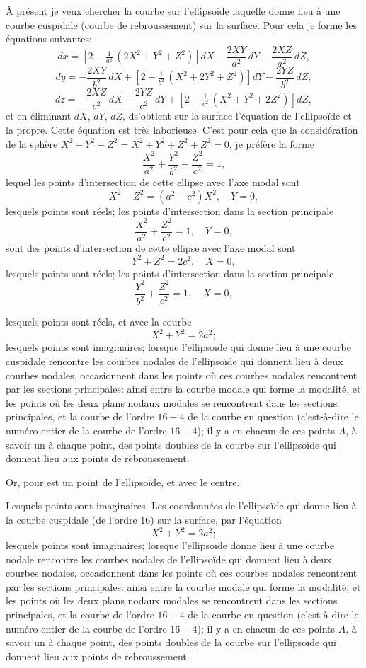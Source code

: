 \documentclass[11pt,a4paper]{article}
\begin{document}
\setcounter{page}{129}

À présent je veux chercher la courbe sur l'ellipsoïde laquelle donne lieu à une courbe cuspidale (courbe de rebroussement) sur la surface. Pour cela je forme les équations suivantes:
\[
dx = \left[2 - \tfrac{1}{a^2}\,(2X^2+Y^2+Z^2)\right]dX - \frac{2XY}{a^2}\,dY - \frac{2XZ}{a^2}\,dZ,
\]
\[
dy = -\frac{2XY}{b^2}\,dX + \left[2 - \tfrac{1}{b^2}\,(X^2+2Y^2+Z^2)\right]dY - \frac{2YZ}{b^2}\,dZ,
\]
\[
dz = -\frac{2XZ}{c^2}\,dX - \frac{2YZ}{c^2}\,dY + \left[2 - \tfrac{1}{c^2}\,(X^2+Y^2+2Z^2)\right]dZ,
\]
et en éliminant $dX$, $dY$, $dZ$, ds'obtient sur la surface l'équation de l'ellipsoïde et la propre. Cette équation est très laborieuse. C'est pour cela que la considération de la sphère $X^2 + Y^2 + Z^2 = X^2 + Y^2 + Z^2 + Z^2 = 0$, je préfère la forme
\[
\frac{X^2}{a^2} + \frac{Y^2}{b^2} + \frac{Z^2}{c^2} = 1,
\]
lequel les points d'intersection de cette ellipse avec l'axe modal sont
\[
X^2 - Z^2 = (a^2 - c^2)X^2,\quad Y = 0,
\]
lesquels points sont réels; les points d'intersection dans la section principale
\[
\frac{X^2}{a^2} + \frac{Z^2}{c^2} = 1,\quad Y = 0,
\]
sont des points d'intersection de cette ellipse avec l'axe modal sont
\[
Y^2 + Z^2 = 2c^2,\quad X = 0,
\]
lesquels points sont réels; les points d'intersection dans la section principale
\[
\frac{Y^2}{b^2} + \frac{Z^2}{c^2} = 1,\quad X = 0,
\]

\setcounter{page}{130}

lesquels points sont réels, et avec la courbe
\[
X^2 + Y^2 = 2a^2;
\]
lesquels points sont imaginaires; lorsque l'ellipsoïde qui donne lieu à une courbe cuspidale rencontre les courbes nodales de l'ellipsoïde qui donnent lieu à deux courbes nodales, occasionnent dans les points où ces courbes nodales rencontrent par les sections principales: ainsi entre la courbe modale qui forme la modalité, et les points où les deux plans nodaux modales se rencontrent dans les sections principales, et la courbe de l'ordre $16 - 4$ de la courbe en question (c'est-à-dire le numéro entier de la courbe de l'ordre $16 - 4$); il y a en chacun de ces points $A$, à savoir un à chaque point, des points doubles de la courbe sur l'ellipsoïde qui donnent lieu aux points de rebroussement.

Or, pour est un point de l'ellipsoïde, et avec le centre.

Lesquels points sont imaginaires. Les coordonnées de l'ellipsoïde qui donne lieu à la courbe cuspidale (de l'ordre 16) sur la surface, par l'équation
\[
X^2 + Y^2 = 2a^2;
\]
lesquels points sont imaginaires; lorsque l'ellipsoïde donne lieu à une courbe nodale rencontre les courbes nodales de l'ellipsoïde qui donnent lieu à deux courbes nodales, occasionnent dans les points où ces courbes nodales rencontrent par les sections principales: ainsi entre la courbe modale qui forme la modalité, et les points où les deux plans nodaux modales se rencontrent dans les sections principales, et la courbe de l'ordre $16 - 4$ de la courbe en question (c'est-à-dire le numéro entier de la courbe de l'ordre $16 - 4$); il y a en chacun de ces points $A$, à savoir un à chaque point, des points doubles de la courbe sur l'ellipsoïde qui donnent lieu aux points de rebroussement.
\end{document}
